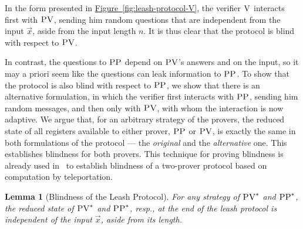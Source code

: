 \documentclass[11pt]{article}
\numberwithin{equation}{section}
\newtheorem{lemma}[theorem]{Lemma}
\theoremstyle{definition}
\theoremstyle{plain}
\newcommand{\expref}[2]{\hyperref[#2]{#1~\ref{#2}}}
\newcommand{\ver}{\textsc{V}}
\newcommand{\pv}{\textsc{PV}}
\newcommand{\pp}{\textsc{PP}}
\begin{document}
In the form presented in \expref{Figure}{fig:leash-protocol-V}, the verifier $\ver$ interacts first with $\pv$, sending him random questions that are independent from the input $\vec{x}$, aside from the input length $n$. It is thus clear that the protocol is blind with respect to $\pv$. 

In contrast, the questions to $\pp$ depend on $\pv$'s answers and on the input, so it may a priori seem like the questions can leak information to $\pp$. To show that the protocol is also blind with respect to $\pp$, we show that there is an alternative formulation, in which the verifier first interacts with $\pp$, sending him random messages, and then only with $\pv$, with whom the interaction is now adaptive. We argue that, for an arbitrary strategy of the provers, the reduced state of all registers available to either prover, $\pp$ or $\pv$, is exactly the same in both formulations of the protocol --- the \emph{original} and the \emph{alternative} one. This establishes blindness for both provers. This technique for proving blindness is already used in~\cite{reichardt2012classical} to establish blindness of a two-prover protocol based on computation by teleportation. 

\begin{lemma}[Blindness of the Leash Protocol]\label{lem:blindness}
For any strategy of $\pv^*$ and $\pp^*$, the reduced state of $\pv^*$
%
and $\pp^*$, resp.,  %
at the end of the leash protocol
is independent of the input $\vec{x}$, aside from its length.
\end{lemma}
\end{document}

